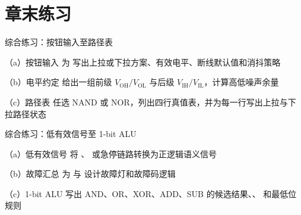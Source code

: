 \section*{章末练习}

\begin{chapterexercise}{综合练习：按钮输入至路径表}
\begin{exercisesubproblem}{（a）按钮输入}
为  写出上拉或下拉方案、有效电平、断线默认值和消抖策略
\end{exercisesubproblem}
\begin{exercisesubproblem}{（b）电平约定}
给出一组前级 $V_\mathrm{OH}/V_\mathrm{OL}$ 与后级 $V_\mathrm{IH}/V_\mathrm{IL}$，计算高低噪声余量
\end{exercisesubproblem}
\begin{exercisesubproblem}{（c）路径表}
任选 NAND 或 NOR，列出四行真值表，并为每一行写出上拉与下拉路径状态
\end{exercisesubproblem}
\end{chapterexercise}

\begin{chapterexercise}{综合练习：低有效信号至 1-bit ALU}
\begin{exercisesubproblem}{（a）低有效信号}
将 、 或急停链路转换为正逻辑语义信号
\end{exercisesubproblem}
\begin{exercisesubproblem}{（b）故障汇总}
为  与  设计故障灯和故障码逻辑
\end{exercisesubproblem}
\begin{exercisesubproblem}{（c）1-bit ALU}
写出 AND、OR、XOR、ADD、SUB 的候选结果、、 和最低位  规则
\end{exercisesubproblem}
\end{chapterexercise}

